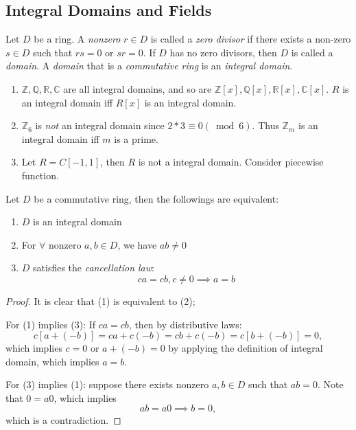 \subsection{Integral Domains and Fields}
\begin{definition}
Let $D$ be a ring. A \emph{nonzero} $r\in D$ is called a \emph{zero divisor} if there exists a non-zero $s\in D$ such that $rs=0$ or $sr=0$. If $D$ has no zero divisors, then $D$ is called a \emph{domain}. A \emph{domain} that is a \emph{commutative ring} is an \emph{integral domain}.
\end{definition}
\begin{example}
\begin{enumerate}
\item
$\mathbb{Z},\mathbb{Q},\mathbb{R},\mathbb{C}$ are all integral domains, and so are $\mathbb{Z}[x],\mathbb{Q}[x],\mathbb{R}[x],\mathbb{C}[x]$. $R$ is an integral domain iff $R[x]$ is an integral domain.
\item
$\mathbb{Z}_6$ is \emph{not} an integral domain since $2*3\equiv0(\bmod 6)$. Thus $\mathbb{Z}_m$ is an integral domain iff $m$ is a prime.
\item
Let $R=C[-1,1]$, then $R$ is not a integral domain. Consider piecewise function.

\end{enumerate}
\end{example}
\begin{proposition}
Let $D$ be a commutative ring, then the followings are equivalent:
\begin{enumerate}
\item
$D$ is an integral domain
\item
For $\forall$ nonzero $a,b\in D$, we have $ab\ne0$
\item
$D$ satisfies the \emph{cancellation law}:
\[
ca=cb,c\ne0\implies 
a=b
\]
\end{enumerate}
\end{proposition}
\begin{proof}
It is clear that (1) is equivalent to (2);

For (1) implies (3): If $ca=cb$, then by distributive laws:
\[
c[a+(-b)]=ca+c(-b)=cb+c(-b)=c[b+(-b)]=0,
\]
which implies $c=0$ or $a+(-b)=0$ by applying the definition of integral domain, which implies $a=b$.

For (3) implies (1): suppose there exists nonzero $a,b\in D$ such that $ab=0$. Note that $0=a0$, which implies
\[
ab=a0\implies b=0,
\]
which is a contradiction.
\end{proof}
